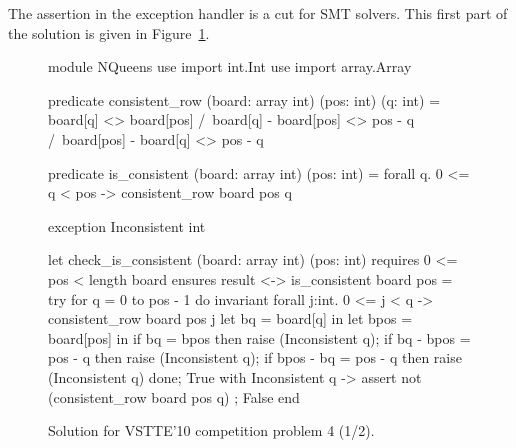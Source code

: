 The assertion in the exception handler is a cut for SMT solvers.
This first part of the solution is given in Figure~\ref{fig:NQueens1}.
\begin{figure}
  \centering
\begin{whycode}
module NQueens
  use import int.Int
  use import array.Array

  predicate consistent_row (board: array int) (pos: int) (q: int) =
    board[q] <> board[pos] /\
    board[q] - board[pos] <> pos - q /\
    board[pos] - board[q] <> pos - q

  predicate is_consistent (board: array int) (pos: int) =
    forall q. 0 <= q < pos -> consistent_row board pos q

  exception Inconsistent int

  let check_is_consistent (board: array int) (pos: int)
    requires { 0 <= pos < length board }
    ensures  { result <-> is_consistent board pos }
  = try
      for q = 0 to pos - 1 do
        invariant {
          forall j:int. 0 <= j < q -> consistent_row board pos j
        }
        let bq   = board[q]   in
        let bpos = board[pos] in
        if bq        = bpos    then raise (Inconsistent q);
        if bq - bpos = pos - q then raise (Inconsistent q);
        if bpos - bq = pos - q then raise (Inconsistent q)
      done;
      True
    with Inconsistent q ->
      assert { not (consistent_row board pos q) };
      False
    end
\end{whycode}
\vspace*{-1em}%
  \caption{Solution for VSTTE'10 competition problem 4 (1/2).}
  \label{fig:NQueens1}
\end{figure}

